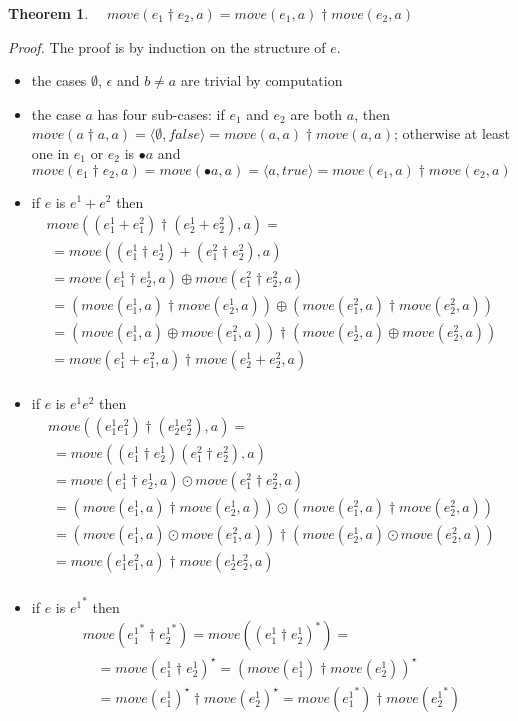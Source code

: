 \documentclass[preprint]{sigplanconf}
\newcommand{\false}{\mathit{false}}
\newcommand{\varoast}{\star}
\newcounter{item}
\newtheorem{theorem}[item]{Theorem}
\newenvironment{proof}{\begin{trivlist}\item[]{\em Proof.}}{\end{trivlist}}
\begin{document}
\begin{theorem}
\label{theo:move_dag}
$\quad move(e_1\dagger e_2,a) = move(e_1,a) \dagger  move(e_2,a)$
\end{theorem}
\begin{proof}
The proof is by induction on the structure of $e$.
\begin{itemize}
\item the cases $\emptyset$, $\epsilon$ and $b \neq a$ are trivial by
      computation
\item the case $a$ has four sub-cases: if $e_1$ and $e_2$ are both $a$,
      then $move(a \dagger a,a) = \langle \emptyset, \false \rangle =
      move(a,a) \dagger  move(a,a)$;
      otherwise
      at least one in $e_1$ or $e_2$ is $\bullet a$ and
      $move(e_1 \dagger e_2,a) = move(\bullet a,a) = \langle a,true \rangle =
      move(e_1,a) \dagger  move(e_2,a)$
\item if $e$ is $e^1 + e^2$ then
\[
\begin{array}{l}
move((e^1_1 + e^2_1)  \dagger (e^1_2 + e^2_2),a) = \\
\; = move((e^1_1 \dagger e^1_2) + (e^2_1 \dagger e^2_2),a) \\
\; = move(e^1_1 \dagger e^1_2,a) \oplus move(e^2_1 \dagger e^2_2,a) \\
\; = (move(e^1_1,a) \dagger move(e^1_2,a)) \oplus
        (move(e^2_1,a) \dagger move(e^2_2,a)) \\
\; = (move(e^1_1,a) \oplus move(e^2_1,a)) \dagger
        (move(e^1_2,a) \oplus move(e^2_2,a)) \\
\; = move(e^1_1+e^2_1,a) \dagger
        move(e^1_2+e^2_2,a) \\
\end{array}
\]
\item if $e$ is $e^1 e^2$ then
\[
\begin{array}{l}
move((e^1_1 e^2_1)  \dagger (e^1_2 e^2_2),a) = \\
\; = move((e^1_1 \dagger e^1_2) (e^2_1 \dagger e^2_2),a) \\
\; = move(e^1_1 \dagger e^1_2,a) \odot move(e^2_1 \dagger e^2_2,a) \\
\; = (move(e^1_1,a) \dagger move(e^1_2,a)) \odot
        (move(e^2_1,a) \dagger move(e^2_2,a)) \\
\; = (move(e^1_1,a) \odot move(e^2_1,a)) \dagger
        (move(e^1_2,a) \odot move(e^2_2,a)) \\
\; = move(e^1_1 e^2_1,a) \dagger
        move(e^1_2 e^2_2,a) \\
\end{array}
\]
\item if $e$ is ${e^1}^*$ then
\[
\begin{array}{l}
move({e_1^1}^* \dagger {e_2^1}^*)
= move((e_1^1 \dagger e_2^1)^*) = \\
\quad = move(e_1^1 \dagger e_2^1)^\varoast
= (move(e_1^1) \dagger move(e_2^1))^\varoast\\
\quad = move(e_1^1)^\varoast \dagger move(e_2^1)^\varoast
= move({e_1^1}^*) \dagger move({e_2^1}^*)\\
\end{array}
\]
      
\end{itemize}
\end{proof}
\end{document}
